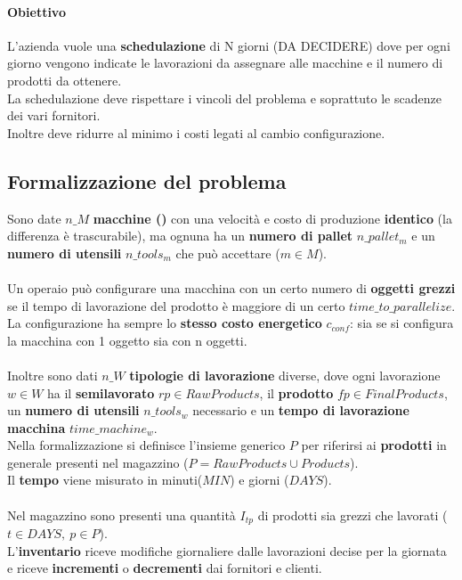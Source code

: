 \paragraph*{Obiettivo} L'azienda vuole una \textbf{schedulazione} di N giorni (DA DECIDERE) dove per ogni giorno vengono indicate le lavorazioni da assegnare alle macchine e il numero di prodotti da ottenere. \\
La schedulazione deve rispettare i vincoli del problema e soprattuto le scadenze dei vari fornitori. \\
Inoltre deve ridurre al minimo i costi legati al cambio configurazione.

\subsection{Formalizzazione del problema}
Sono date \(n\_M\) \textbf{macchine ()} con una velocità e costo di produzione \textbf{identico} (la differenza è trascurabile), ma ognuna ha un \textbf{numero di pallet} \(n\_pallet_m\) e un \textbf{numero di utensili} \(n\_tools_m\) che può accettare (\(m \in M\)).
\\ \\
Un operaio può configurare una macchina con un certo numero di \textbf{oggetti grezzi} se il tempo di lavorazione del prodotto è maggiore di un certo \(time\_to\_parallelize\).\\
La configurazione ha sempre lo \textbf{stesso costo energetico} \(c_{conf}\): sia se si configura la macchina con 1 oggetto sia con n oggetti.
\\\\
Inoltre sono dati \(n\_W\) \textbf{tipologie di lavorazione} diverse, dove ogni lavorazione \(w \in W\) ha il \textbf{semilavorato} \(rp \in RawProducts\), il \textbf{prodotto} \(fp \in FinalProducts\), un \textbf{numero di utensili} \(n\_tools_w\) necessario e un \textbf{tempo di lavorazione macchina} \(time\_machine_w\).\\
Nella formalizzazione si definisce l'insieme generico \(P\) per riferirsi ai \textbf{prodotti} in generale presenti nel magazzino (\(P = RawProducts \cup Products\)).\\
Il \textbf{tempo} viene misurato in minuti(\(MIN\)) e giorni (\(DAYS\)).
\\\\
Nel magazzino sono presenti una quantità \(I_{tp}\) di prodotti sia grezzi che lavorati (\(t \in DAYS,\ p \in P\)). \\
L'\textbf{inventario} riceve modifiche giornaliere dalle lavorazioni decise per la giornata e riceve \textbf{incrementi} o \textbf{decrementi} dai fornitori e clienti.\\

